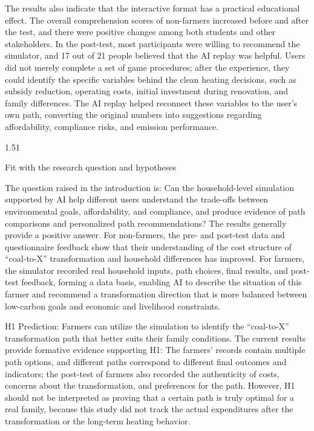\documentclass[stu,12pt,floatsintext,donotrepeattitle]{apa7}
\makeatletter
\newcommand{\Sihao}{\fontsize{14pt}{18pt}\selectfont}
\renewcommand{\subsection}{\@startsection{subsection}{2}{\z@}%
  {1.5\baselineskip}{1\baselineskip}%
  {\normalfont\Sihao\bfseries\raggedright}}
\makeatother
\begin{document}
The results also indicate that the interactive format has a practical educational effect. The overall comprehension scores of non-farmers increased before and after the test, and there were positive changes among both students and other stakeholders. In the post-test, most participants were willing to recommend the simulator, and 17 out of 21 people believed that the AI replay was helpful. Users did not merely complete a set of game procedures; after the experience, they could identify the specific variables behind the clean heating decisions, such as subsidy reduction, operating costs, initial investment during renovation, and family differences. The AI replay helped reconnect these variables to the user's own path, converting the original numbers into suggestions regarding affordability, compliance risks, and emission performance.

\subsection{Fit with the research question and hypotheses}

The question raised in the introduction is: Can the household-level simulation supported by AI help different users understand the trade-offs between environmental goals, affordability, and compliance, and produce evidence of path comparisons and personalized path recommendations? The results generally provide a positive answer. For non-farmers, the pre- and post-test data and questionnaire feedback show that their understanding of the cost structure of ``coal-to-X'' transformation and household differences has improved. For farmers, the simulator recorded real household inputs, path choices, final results, and post-test feedback, forming a data basis, enabling AI to describe the situation of this farmer and recommend a transformation direction that is more balanced between low-carbon goals and economic and livelihood constraints.

H1 Prediction: Farmers can utilize the simulation to identify the ``coal-to-X'' transformation path that better suits their family conditions. The current results provide formative evidence supporting H1: The farmers' records contain multiple path options, and different paths correspond to different final outcomes and indicators; the post-test of farmers also recorded the authenticity of costs, concerns about the transformation, and preferences for the path. However, H1 should not be interpreted as proving that a certain path is truly optimal for a real family, because this study did not track the actual expenditures after the transformation or the long-term heating behavior.
\end{document}
